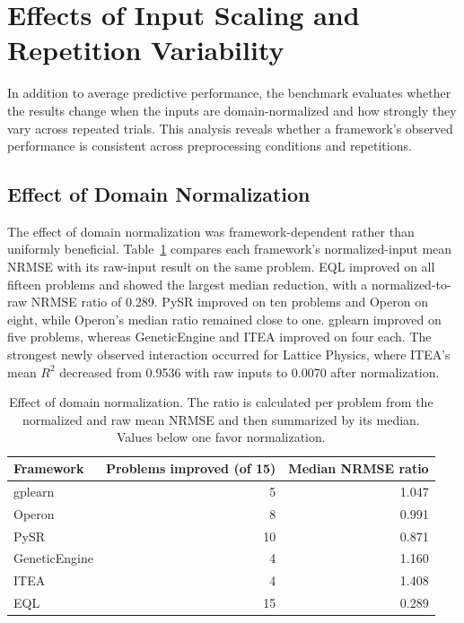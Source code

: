 \documentclass[12pt,oneside,bibtotoc,liststotoc]{scrbook}
\begin{document}
\section{Effects of Input Scaling and Repetition Variability}

In addition to average predictive performance, the benchmark evaluates whether the results change when the inputs are domain-normalized and how strongly they vary across repeated trials. This analysis reveals whether a framework's observed performance is consistent across preprocessing conditions and repetitions.

\subsection{Effect of Domain Normalization}

The effect of domain normalization was framework-dependent rather than uniformly beneficial. Table~\ref{tab:results-scaling-effect} compares each framework's normalized-input mean NRMSE with its raw-input result on the same problem. EQL improved on all fifteen problems and showed the largest median reduction, with a normalized-to-raw NRMSE ratio of 0.289. PySR improved on ten problems and Operon on eight, while Operon's median ratio remained close to one. gplearn improved on five problems, whereas GeneticEngine and ITEA improved on four each. The strongest newly observed interaction occurred for Lattice Physics, where ITEA's mean $R^2$ decreased from 0.9536 with raw inputs to 0.0070 after normalization.

\begin{table}[H]
    \centering
    \caption{Effect of domain normalization. The ratio is calculated per problem from the normalized and raw mean NRMSE and then summarized by its median. Values below one favor normalization.}
    \label{tab:results-scaling-effect}
    \begin{tabular}{lrr}
        \toprule
        Framework & Problems improved (of 15) & Median NRMSE ratio \\
        \midrule
        gplearn & 5 & 1.047 \\
        Operon & 8 & 0.991 \\
        PySR & 10 & 0.871 \\
        GeneticEngine & 4 & 1.160 \\
        ITEA & 4 & 1.408 \\
        EQL & 15 & 0.289 \\
        \bottomrule
    \end{tabular}
\end{table}
\end{document}
